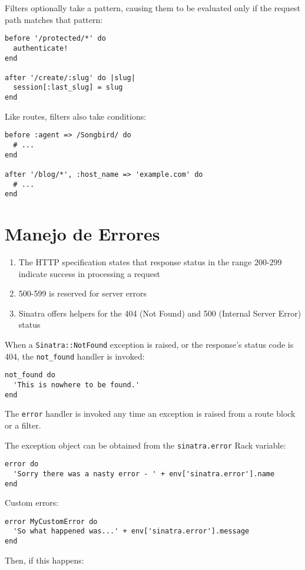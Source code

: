 Filters optionally take a pattern, causing them to be evaluated
only if the request path matches that pattern:
\begin{verbatim}
before '/protected/*' do
  authenticate!
end

after '/create/:slug' do |slug|
  session[:last_slug] = slug
end
\end{verbatim}

Like routes, filters also take conditions:
\begin{verbatim}
before :agent => /Songbird/ do
  # ...
end

after '/blog/*', :host_name => 'example.com' do
  # ...
end
\end{verbatim}

\section{Manejo de Errores}

\begin{enumerate}
\item 
The HTTP specification states that response status in the range  200-299
indicate success in processing a request
\item 
500-599 is reserved for server errors
\item 
Sinatra  offers helpers for the 404 (Not Found) and 500 (Internal Server Error) status
\end{enumerate}

When a \verb|Sinatra::NotFound| exception is raised, or the response’s
status code is 404, the \verb|not_found| handler is invoked:

\begin{verbatim}
not_found do
  'This is nowhere to be found.'
end
\end{verbatim}

The \verb|error| handler is invoked any time an exception is raised from
a route block or a filter. 

The exception object can be obtained
from the \verb|sinatra.error| Rack variable:

\begin{verbatim}
error do
  'Sorry there was a nasty error - ' + env['sinatra.error'].name
end
\end{verbatim}
Custom errors:

\begin{verbatim}
error MyCustomError do
  'So what happened was...' + env['sinatra.error'].message
end
\end{verbatim}
Then, if this happens:

